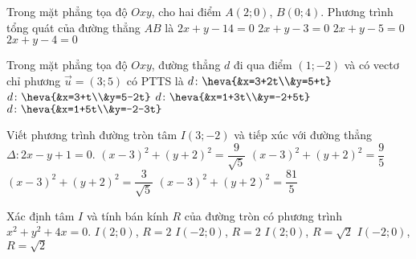 	
	\begin{ex}%
		Trong mặt phẳng tọa độ $Oxy$, cho hai điểm $A(2;0)$, $B(0;4)$. Phương trình tổng quát của đường thẳng $AB$ là
		\choice
		{$2x+y-14=0$}
		{$2x+y-3=0$}
		{$2x+y-5=0$}
		{\True $2x+y-4=0$}
	\end{ex}

	\begin{ex}%
		Trong mặt phẳng tọa độ $Oxy$, đường thẳng $d$ đi qua điểm $(1; -2)$ và có vectơ chỉ phương $\overrightarrow{u}=(3; 5)$ có PTTS là 
		\choice
		{$d\colon\heva{&x=3+2t\\&y=5+t}$}
		{$d\colon\heva{&x=3+t\\&y=5-2t}$}
		{\True $d\colon \heva{&x=1+3t\\&y=-2+5t}$}
		{$d\colon \heva{&x=1+5t\\&y=-2-3t}$}
	\end{ex}	
	
	\begin{ex}%
		Viết phương trình đường tròn tâm $I\left( 3;-2 \right)$ và tiếp xúc với đường thẳng $\Delta \colon 2x-y+1=0$. 
		\choice
		{$\left( x-3 \right)^{2}+\left( y+2 \right)^{2}=\dfrac{9}{\sqrt{5}}$}
		{$\left( x-3 \right)^{2}+\left( y+2 \right)^{2}=\dfrac{9}{5}$}
		{$\left( x-3 \right)^{2}+\left( y+2 \right)^{2}=\dfrac{3}{\sqrt{5}}$}
		{\True $\left( x-3 \right)^{2}+\left( y+2 \right)^{2}=\dfrac{81}{5}$}
	\end{ex}

	\begin{ex}%
		Xác định tâm $I$ và tính bán kính $R$ của đường tròn có phương trình $x^2+y^2+4x=0$. 
		\choice
		{$I\left( 2;0 \right)$, $R=2$}
		{\True $I\left( -2;0 \right)$, $R=2$}
		{$I\left( 2;0 \right)$, $R=\sqrt{2}$}
		{$I\left( -2;0 \right)$, $R=\sqrt{2}$}
	\end{ex}
	

